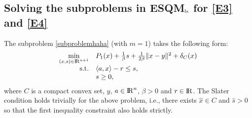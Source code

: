 \documentclass[10pt]{article}
\numberwithin{equation}{section}
\def\R{{\rm I\!R}}
\begin{document}

\subsection{Solving the subproblems in ESQM$_{\rm ls}$ for \eqref{E3} and \eqref{E4}}
The subproblem \eqref{subproblemhaha} (with $m = 1$) takes the following form:
\begin{equation}\label{solvsub1}
  \begin{array}{rl}
\min\limits_{(x,s)\in\R^{n+1}} & P_1(x) + \frac{1}{\beta} s + \frac{1}{2\beta}\|x - y\|^2 + \delta_{C}(x)\\
{\rm s.t.} & \langle a, x\rangle - r \leq s,\\
& s \geq 0,
  \end{array}
\end{equation}
where $C$ is a compact convex set, $y$, $a\in\R^n$, $\beta >0$ and $r\in \R$. The Slater condition holds trivially for the above problem, i.e., there exists $\hat x \in C$ and $\hat s > 0$ so that the first inequality constraint also holds strictly.
\end{document}
